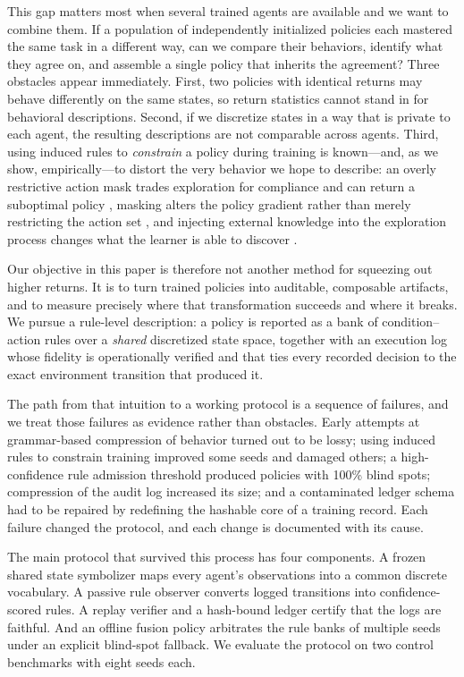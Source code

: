 \documentclass[11pt]{article}
\begin{document}
This gap matters most when several trained agents are available and we want to combine them. If a
population of independently initialized policies each mastered the same task in a different way, can
we compare their behaviors, identify what they agree on, and assemble a single policy that inherits
the agreement? Three obstacles appear immediately. First, two policies with identical returns may
behave differently on the same states, so return statistics cannot stand in for behavioral
descriptions. Second, if we discretize states in a way that is private to each agent, the resulting
descriptions are not comparable across agents. Third, using induced rules to \emph{constrain} a
policy during training is known---and, as we show, empirically---to distort the very behavior we
hope to describe: an overly restrictive action mask trades exploration for compliance and can return
a suboptimal policy \cite{stappert2026integrating}, masking alters the policy gradient rather than
merely restricting the action set \cite{huang2022masking}, and injecting external knowledge into the
exploration process changes what the learner is able to discover \cite{garcia2015comprehensive}.

Our objective in this paper is therefore not another method for squeezing out higher returns. It is
to turn trained policies into auditable, composable artifacts, and to measure precisely where that
transformation succeeds and where it breaks. We pursue a rule-level description: a policy is
reported as a bank of condition--action rules over a \emph{shared} discretized state space, together
with an execution log whose fidelity is operationally verified and that ties every recorded decision
to the exact environment transition
that produced it.

The path from that intuition to a working protocol is a sequence of failures, and we treat those
failures as evidence rather than obstacles. Early attempts at grammar-based compression of behavior
turned out to be lossy; using induced rules to constrain training improved some seeds and damaged
others; a high-confidence rule admission threshold produced policies with 100\% blind spots;
compression of the audit log increased its size; and a contaminated ledger schema had to be repaired
by redefining the hashable core of a training record. Each failure changed the protocol, and each
change is documented with its cause.

The main protocol that survived this process has four components. A frozen shared state symbolizer
maps every agent's observations into a common discrete vocabulary. A passive rule observer converts
logged transitions into confidence-scored rules. A replay verifier and a hash-bound ledger certify
that the logs are faithful. And an offline fusion policy arbitrates the rule banks of multiple seeds
under an explicit blind-spot fallback. We evaluate the protocol on two control benchmarks with eight
seeds each.
\end{document}
